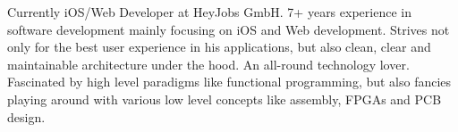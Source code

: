 

\begin{cvparagraph}
Currently iOS/Web Developer at HeyJobs GmbH. 7+ years experience in software development mainly focusing on iOS and Web development. Strives not only for the best user experience in his applications, but also clean, clear and maintainable architecture under the hood. An all-round technology lover. Fascinated by high level paradigms like functional programming, but also fancies playing around with various low level concepts like assembly, FPGAs and PCB design.
\end{cvparagraph}
